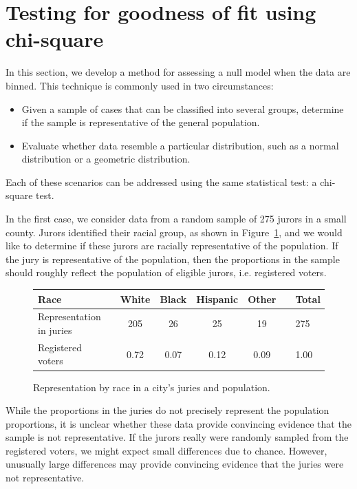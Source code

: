 \section{Testing for goodness of fit using chi-square}
\label{oneWayChiSquare}

In this section, we develop a method for assessing a null model when the data are binned.
This technique is commonly used in two circumstances:
\begin{itemize}
\setlength{\itemsep}{0mm}
\item Given a sample of cases that can be classified into several groups, determine if the sample is representative of the general population.
\item Evaluate whether data resemble a particular distribution, such as a normal distribution or a geometric distribution.
\end{itemize}
Each of these scenarios can be addressed using the same statistical test: a chi-square test.


In the first case, we consider data from a random sample of 275 jurors in a small county. Jurors identified their racial group, as shown in Figure~\ref{juryRepresentationAndCityRepresentationForRace}, and we would like to determine if these jurors are racially representative of the population.  If the jury is representative of the population, then the proportions in the sample should roughly reflect the population of eligible jurors, i.e. registered voters.

\begin{figure}[h]
\centering
\begin{tabular}{ll ccc c ll}
\hline
Race	 & \hspace{2mm} & White & Black & Hispanic & Other & \hspace{2mm} & Total \\
\hline
Representation in juries &	& 205 & 26 & 25 & 19 & & 275 \\
Registered voters	 & 		& 0.72 & 0.07 & 0.12 & 0.09 & & 1.00 \\
\hline
\end{tabular}
\caption{Representation by race in a city's juries and population.}
\label{juryRepresentationAndCityRepresentationForRace}
\end{figure}

While the proportions in the juries do not precisely represent the population proportions, it is unclear whether these data provide convincing evidence that the sample is not representative. If the jurors really were randomly sampled from the registered voters, we might expect small differences due to chance. However, unusually large differences may provide convincing evidence that the juries were not representative.

